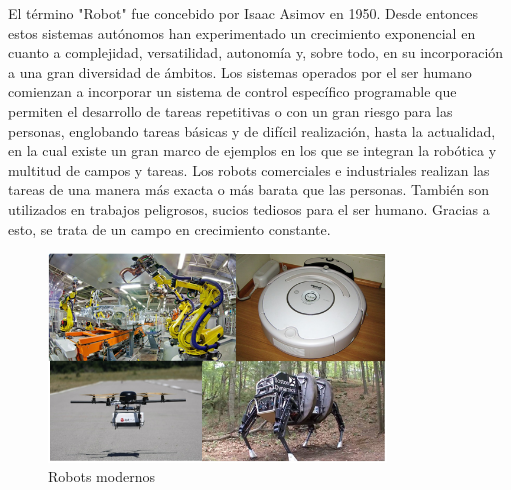 El término "Robot" fue concebido por Isaac Asimov en 1950. Desde entonces estos sistemas autónomos han experimentado un crecimiento exponencial en cuanto a complejidad, versatilidad, autonomía y, sobre todo, en su incorporación a una gran diversidad de ámbitos. Los sistemas operados por el ser humano comienzan a incorporar un sistema de control específico programable que permiten el desarrollo de tareas repetitivas o con un gran riesgo para las personas, englobando tareas básicas y de difícil realización, hasta la actualidad, en la cual existe un gran marco de ejemplos en los que se integran la robótica y multitud de campos y tareas. Los robots comerciales e industriales realizan las tareas de una manera más exacta o más barata que las personas. También son utilizados en trabajos peligrosos, sucios tediosos para el ser humano. Gracias a esto, se trata de un campo en crecimiento constante.

\begin{figure}[H]
	\begin{center}
		\includegraphics[width=0.8\textwidth]{figures/robots.png}
		\caption{Robots modernos}
		\label{fig.robots}
	\end{center}
\end{figure}

